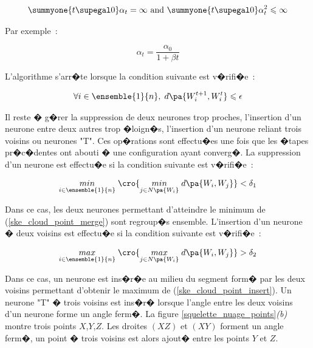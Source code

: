         
            \begin{eqnarray*}
            \summyone{t \supegal 0} \alpha_t = \infty \text { and } \summyone{t \supegal 0} 
                        \alpha_t^2 \leqslant \infty
            \end{eqnarray*}
            
Par exemple~:

            $$
            \alpha_t = \frac{\alpha_0}{1+\beta t}
            $$            

L'algorithme s'arr�te lorsque la condition suivante est v�rifi�e~:

            \begin{eqnarray*}
            \forall i \in \ensemble{1}{n}, \; d\pa{W_i^{t+1}, W_i^{t} } \leqslant \epsilon
            \end{eqnarray*}

Il reste � g�rer la suppression de deux neurones trop proches, l'insertion d'un neurone entre deux autres trop �loign�s, l'insertion d'un neurone reliant trois voisins ou neurones "T". Ces op�rations sont effectu�es une fois que les �tapes pr�c�dentes ont abouti � une configuration ayant converg�. La suppression d'un neurone est effectu�e si la condition suivante est v�rifi�e~:


            \begin{eqnarray}
            \underset{ i \in \ensemble{1}{n} }     { min }\; \cro{ 
            \underset{ j \in N\pa{W_i} }              { min }\; d\pa{W_i,W_j} } 
                            < \delta_1 
            \label{ske_cloud_point_merge}
            \end{eqnarray}

Dans ce cas, les deux neurones permettant d'atteindre le minimum de (\ref{ske_cloud_point_merge}) sont regroup�s ensemble. L'insertion d'un neurone � deux voisins est effectu�e si la condition suivante est v�rifi�e~:

            \begin{eqnarray}
            \underset{ i \in \ensemble{1}{n} }     { max }\; \cro{ 
            \underset{ j \in N\pa{W_i} }              { max }\; d\pa{W_i,W_j} } 
                            > \delta_2
            \label{ske_cloud_point_insert}
            \end{eqnarray}

Dans ce cas, un neurone est ins�r�e au milieu du segment form� par les deux voisins permettant d'obtenir le maximum de (\ref{ske_cloud_point_insert}). Un neurone "T" � trois voisins est ins�r� lorsque l'angle entre les deux voisins d'un neurone forme un angle ferm�. La figure \ref{squelette_nuage_points}\textit{(b)} montre trois points $X$,$Y$,$Z$. Les droites $(XZ)$ et $(XY)$ forment un angle ferm�, un point � trois voisins est alors ajout� entre les points $Y$ et $Z$.





